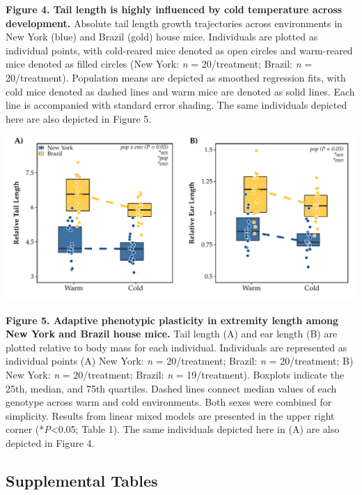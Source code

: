 \documentclass[
]{article}
\begin{document}
\textbf{Figure 4. Tail length is highly influenced by cold temperature
across development.} Absolute tail length growth trajectories across
environments in New York (blue) and Brazil (gold) house mice.
Individuals are plotted as individual points, with cold-reared mice
denoted as open circles and warm-reared mice denoted as filled circles
(New York: \emph{n} = 20/treatment; Brazil: \emph{n} = 20/treatment).
Population means are depicted as smoothed regression fits, with cold
mice denoted as dashed lines and warm mice are denoted as solid lines.
Each line is accompanied with standard error shading. The same
individuals depicted here are also depicted in Figure 5.

\newpage

\includegraphics{../results/figures/RXNs_Extremities_relative.pdf}

\textbf{Figure 5. Adaptive phenotypic plasticity in extremity length
among New York and Brazil house mice.} Tail length (A) and ear length
(B) are plotted relative to body mass for each individual. Individuals
are represented as individual points (A) New York: \emph{n} =
20/treatment; Brazil: \emph{n} = 20/treatment; B) New York: \emph{n} =
20/treatment; Brazil: \emph{n} = 19/treatment). Boxplots indicate the
25th, median, and 75th quartiles. Dashed lines connect median values of
each genotype across warm and cold environments. Both sexes were
combined for simplicity. Results from linear mixed models are presented
in the upper right corner (*\emph{P}\textless0.05; Table 1). The same
individuals depicted here in (A) are also depicted in Figure 4.

\newpage

\hypertarget{supplemental-tables}{%
\subsection{Supplemental Tables}\label{supplemental-tables}}
\end{document}
